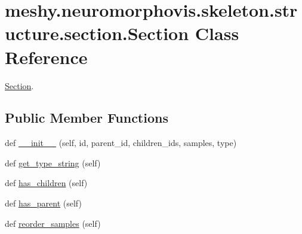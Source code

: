 \hypertarget{classmeshy_1_1neuromorphovis_1_1skeleton_1_1structure_1_1section_1_1Section}{}\section{meshy.\+neuromorphovis.\+skeleton.\+structure.\+section.\+Section Class Reference}
\label{classmeshy_1_1neuromorphovis_1_1skeleton_1_1structure_1_1section_1_1Section}


\hyperlink{classmeshy_1_1neuromorphovis_1_1skeleton_1_1structure_1_1section_1_1Section}{Section}.  


\subsection*{Public Member Functions}
\begin{DoxyCompactItemize}
\item 
def \hyperlink{classmeshy_1_1neuromorphovis_1_1skeleton_1_1structure_1_1section_1_1Section_a05f199f33cc9f9b5bb66d0a1ac42adfd}{\+\_\+\+\_\+init\+\_\+\+\_\+} (self, id, parent\+\_\+id, children\+\_\+ids, samples, type)
\item 
def \hyperlink{classmeshy_1_1neuromorphovis_1_1skeleton_1_1structure_1_1section_1_1Section_abae4c08d6e1e71b84b31e463a05841e8}{get\+\_\+type\+\_\+string} (self)
\item 
def \hyperlink{classmeshy_1_1neuromorphovis_1_1skeleton_1_1structure_1_1section_1_1Section_a34df49068e1cff4653c73f5ff88cbf64}{has\+\_\+children} (self)
\item 
def \hyperlink{classmeshy_1_1neuromorphovis_1_1skeleton_1_1structure_1_1section_1_1Section_a97cb30c0b272d3ab1b0d776606c41b76}{has\+\_\+parent} (self)
\item 
def \hyperlink{classmeshy_1_1neuromorphovis_1_1skeleton_1_1structure_1_1section_1_1Section_a58f0c2e5f427d563ed91be2413d13e37}{reorder\+\_\+samples} (self)
\end{DoxyCompactItemize}
